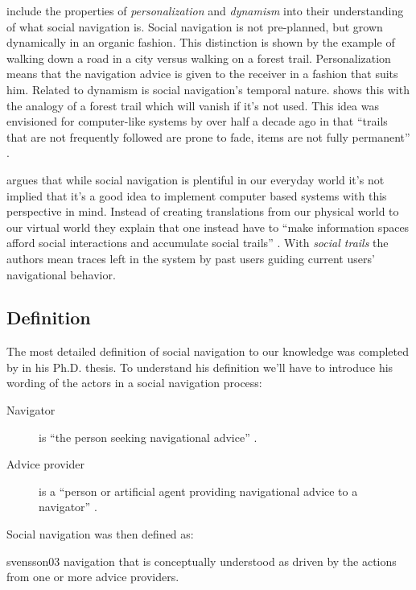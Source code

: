 \citet[p.~39]{dieberger00b} include the properties of \emph{personalization}
and \emph{dynamism} into their understanding of what social navigation is.
Social navigation is not pre-planned, but grown dynamically in an organic
fashion. This distinction is shown by the example of walking down a road in a
city versus walking on a forest trail. Personalization means that the
navigation advice is given to the receiver in a fashion that suits him.
Related to dynamism is social navigation's temporal nature.
\citet[p.~39]{dieberger00b} shows this with the analogy of a forest trail
which will vanish if it's not used. This idea was envisioned for computer-like
systems by \citeauthor{bush45} over half a decade ago in that
  ``trails that are not frequently followed are prone to fade, items are
  not fully permanent'' \citeyearpar[p.~106]{bush45}.

\citet{svensson05} argues that while social navigation is plentiful in
our everyday world it's not implied that it's a good idea to implement
computer based systems with this perspective in mind. Instead of creating
translations from our physical world to our virtual world
they explain that one instead have to
  ``make information spaces afford social interactions and accumulate
  social trails'' \citeyearpar[p.~377]{svensson05}.
With \emph{social trails} the authors mean traces left in the system by past
users guiding current users' navigational behavior.

\subsection{Definition}

The most detailed definition of social navigation to our knowledge was
completed by \citet{svensson03} in his Ph.D. thesis. To understand his
definition we'll have to introduce his wording of the actors in a social
navigation process:

\begin{description}
  \item[Navigator] is ``the person seeking navigational advice''
    \citep[p.~20]{svensson03}.
  \item[Advice provider] is a ``person or artificial agent providing
    navigational advice to a navigator'' \citep[p.~20]{svensson03}.
\end{description}

Social navigation was then defined as:

\begin{citequote}[p.~20]{svensson03}
  navigation that is conceptually understood as driven by the actions from one
  or more advice providers.
\end{citequote}

